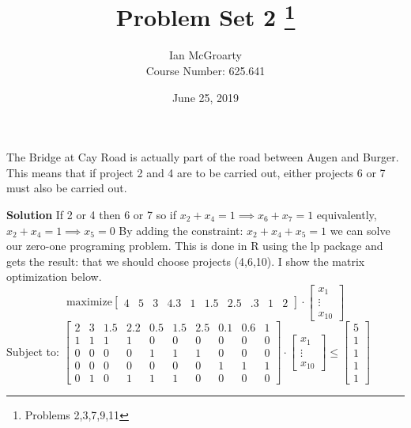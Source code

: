 \documentclass[12pt]{article}
\title{Problem Set 2 \thanks{Problems 2,3,7,9,11}}
\author{Ian McGroarty \\
	Course Number: 625.641}
\date{June 25, 2019}
\newenvironment{problem}[3][Problem]{\begin{trivlist}
\item[\hskip \labelsep {\bfseries #1}\hskip \labelsep {\bfseries #2.}]}{\end{trivlist}}
\begin{document}
\maketitle
\newpage
\begin{problem}2. The Bridge at Cay Road is actually part of the road between Augen and Burger. This means that if project 2 and 4 are to be carried out, either projects 6 or 7 must also be carried out.

\textbf{Solution} If 2 or 4 then 6 or 7 so if 
$x_2 + x_4 = 1 \implies x_6 +x_7 = 1$ equivalently, $x_2 + x_4 = 1 \implies x_5=0$ By adding the constraint:
$ x_2 + x_4 +x_5 = 1$ we can solve our zero-one programing problem. This is done in R using the lp package and gets the result: that we should choose projects (4,6,10). I show the matrix optimization below. 
$$ \text{maximize} 
\begin{bmatrix}
4&5&3&4.3&1&1.5&2.5&.3&1&2
\end{bmatrix}
\cdot
\begin{bmatrix}
x_1\\ \vdots \\x_{10} 
\end{bmatrix}
$$
Subject to: 
$
\begin{bmatrix}
2&3&1.5&2.2&0.5&1.5&2.5&0.1&0.6&1\\
1&1&1&1&0&0&0&0&0&0 \\
0&0&0&0&1&1&1&0&0&0 \\
0&0&0&0&0&0&0&1&1&1 \\
0&1&0&1&1&1&0&0&0&0
\end{bmatrix}
\cdot
\begin{bmatrix}
x_1\\ \vdots \\x_{10} 
\end{bmatrix}
\leq 
\begin{bmatrix}
5\\1\\1\\1\\1
\end{bmatrix}
$
 \end{problem}
\end{document}
